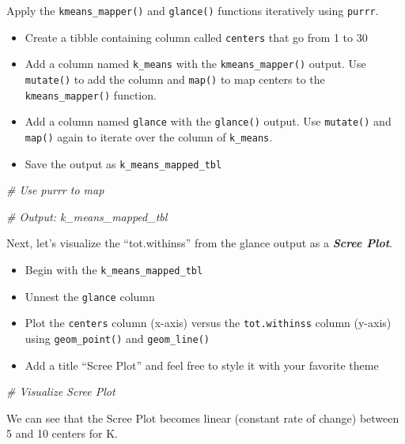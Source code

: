 \documentclass[
]{article}
\newenvironment{Shaded}{\begin{snugshade}}{\end{snugshade}}
\newcommand{\CommentTok}[1]{\textcolor[rgb]{0.56,0.35,0.01}{\textit{#1}}}
\providecommand{\tightlist}{%
  \setlength{\itemsep}{0pt}\setlength{\parskip}{0pt}}
\begin{document}
Apply the \texttt{kmeans\_mapper()} and \texttt{glance()} functions
iteratively using \texttt{purrr}.

\begin{itemize}
\tightlist
\item
  Create a tibble containing column called \texttt{centers} that go from
  1 to 30
\item
  Add a column named \texttt{k\_means} with the
  \texttt{kmeans\_mapper()} output. Use \texttt{mutate()} to add the
  column and \texttt{map()} to map centers to the
  \texttt{kmeans\_mapper()} function.
\item
  Add a column named \texttt{glance} with the \texttt{glance()} output.
  Use \texttt{mutate()} and \texttt{map()} again to iterate over the
  column of \texttt{k\_means}.
\item
  Save the output as \texttt{k\_means\_mapped\_tbl}
\end{itemize}

\begin{Shaded}
\begin{Highlighting}[]
\CommentTok{# Use purrr to map}


\CommentTok{# Output: k_means_mapped_tbl }
\end{Highlighting}
\end{Shaded}

Next, let's visualize the ``tot.withinss'' from the glance output as a
\textbf{\emph{Scree Plot}}.

\begin{itemize}
\tightlist
\item
  Begin with the \texttt{k\_means\_mapped\_tbl}
\item
  Unnest the \texttt{glance} column
\item
  Plot the \texttt{centers} column (x-axis) versus the
  \texttt{tot.withinss} column (y-axis) using \texttt{geom\_point()} and
  \texttt{geom\_line()}
\item
  Add a title ``Scree Plot'' and feel free to style it with your
  favorite theme
\end{itemize}

\begin{Shaded}
\begin{Highlighting}[]
\CommentTok{# Visualize Scree Plot}
\end{Highlighting}
\end{Shaded}

We can see that the Scree Plot becomes linear (constant rate of change)
between 5 and 10 centers for K.
\end{document}

